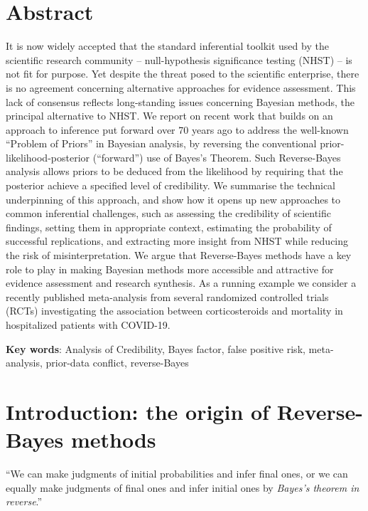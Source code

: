 \section*{Abstract}
It is now widely accepted that the standard inferential toolkit used by the
scientific research community -- null-hypothesis significance testing (NHST) --
is not fit for purpose. Yet despite the threat posed to the scientific
enterprise, there is no agreement concerning alternative approaches for evidence
assessment. This lack of consensus reflects long-standing issues concerning
Bayesian methods, the principal alternative to NHST. We report on recent work
that builds on an approach to inference put forward over 70 years ago to address
the well-known ``Problem of Priors'' in Bayesian analysis, by reversing the
conventional prior-likelihood-posterior (``forward'') use of Bayes's Theorem.
Such Reverse-Bayes analysis allows priors to be deduced from the likelihood by
requiring that the posterior achieve a specified level of credibility. We
summarise the technical underpinning of this approach, and show how it opens up
new approaches to common inferential challenges, such as assessing the
credibility of scientific findings, setting them in appropriate context,
estimating the probability of successful replications, and extracting more
insight from NHST while reducing the risk of misinterpretation. We argue that
Reverse-Bayes methods have a key role to play in making Bayesian methods more
accessible and attractive for evidence assessment and research synthesis. As a
running example we consider a recently published meta-analysis from several
randomized controlled trials (RCTs) investigating the association between
corticosteroids and mortality in hospitalized patients with COVID-19.

\textbf{Key words}: Analysis of Credibility, Bayes factor, false positive risk,
meta-analysis, prior-data conflict, reverse-Bayes

\section{Introduction: the origin of Reverse-Bayes methods}\label{sec4:intro}
\begin{center}
\begin{minipage}{12cm}
  { { { ``We can make judgments of initial probabilities and infer final ones,
        or we can equally make judgments of final ones and infer initial ones by
        \emph{Bayes's theorem in reverse}.'' }}}
\end{minipage}
\end{center}
\begin{flushright}
   \citet[p. 29]{Good1983}
\end{flushright}

